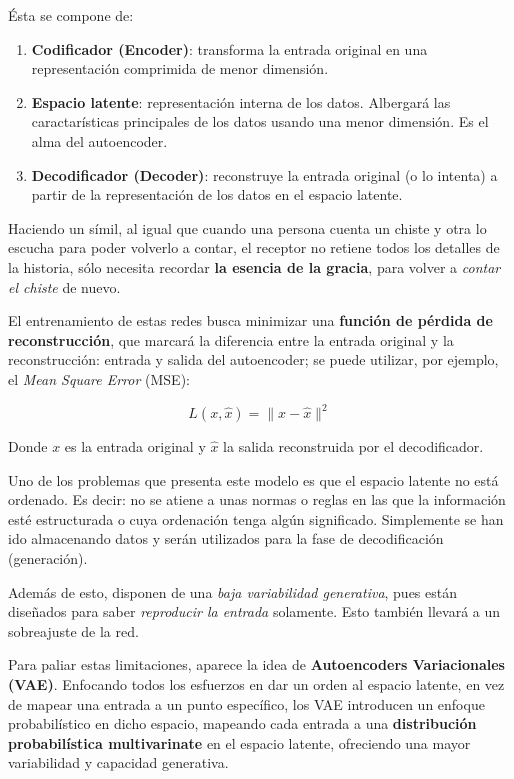 Ésta se compone de:

\begin{enumerate}
    \item \textbf{Codificador (Encoder)}: transforma la entrada original en una representación comprimida de menor dimensión.
    \item \textbf{Espacio latente}: representación interna de los datos. Albergará las caractarísticas principales de los datos usando una menor dimensión. Es el alma del autoencoder.
    \item \textbf{Decodificador (Decoder)}: reconstruye la entrada original (o lo intenta) a partir de la representación de los datos en el espacio latente.
\end{enumerate}


Haciendo un símil, al igual que cuando una persona cuenta un chiste y otra lo escucha para poder volverlo a contar, el receptor no retiene todos los detalles de la historia, sólo necesita recordar \textbf{la esencia de la gracia}, para volver a \emph{contar el chiste} de nuevo.

El entrenamiento de estas redes busca minimizar una \textbf{función de pérdida de reconstrucción}, que marcará la diferencia entre la entrada original y la reconstrucción: entrada y salida del autoencoder; se puede utilizar, por ejemplo, el \emph{Mean Square Error} (MSE):

\begin{equation}
    L(x, \hat{x}) = \| x - \hat{x} \|^2
\end{equation}

Donde \( x \) es la entrada original y \( \hat{x} \) la salida reconstruida por el decodificador.

Uno de los problemas que presenta este modelo es que el espacio latente no está ordenado. Es decir: no se atiene a unas normas o reglas en las que la información esté estructurada o cuya ordenación tenga algún significado. Simplemente se han ido almacenando datos y serán utilizados para la fase de decodificación (generación).

Además de esto, disponen de una \emph{baja variabilidad generativa}, pues están diseñados para saber \emph{reproducir la entrada} solamente. Esto también llevará a un sobreajuste de la red.

Para paliar estas limitaciones, aparece la idea de \textbf{Autoencoders Variacionales (VAE)}. Enfocando todos los esfuerzos en dar un orden al espacio latente, en vez de mapear una entrada a un punto específico, los VAE introducen un enfoque probabilístico en dicho espacio, mapeando cada entrada a una \textbf{distribución probabilística \textbf{multivarinate}} en el espacio latente, ofreciendo una mayor variabilidad y capacidad generativa.

